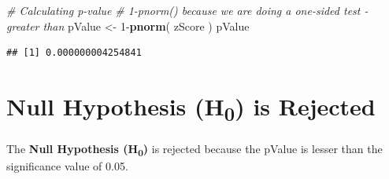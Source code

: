 \documentclass[]{article}
\newenvironment{Shaded}{\begin{snugshade}}{\end{snugshade}}
\newcommand{\KeywordTok}[1]{\textcolor[rgb]{0.13,0.29,0.53}{\textbf{{#1}}}}
\newcommand{\DecValTok}[1]{\textcolor[rgb]{0.00,0.00,0.81}{{#1}}}
\newcommand{\StringTok}[1]{\textcolor[rgb]{0.31,0.60,0.02}{{#1}}}
\newcommand{\CommentTok}[1]{\textcolor[rgb]{0.56,0.35,0.01}{\textit{{#1}}}}
\newcommand{\NormalTok}[1]{{#1}}
\begin{document}
\begin{Shaded}
\begin{Highlighting}[]
\CommentTok{# Calculating p-value}
\CommentTok{# 1-pnorm() because we are doing a one-sided test - greater than}
\NormalTok{pValue <-}\StringTok{ }\DecValTok{1}\NormalTok{-}\KeywordTok{pnorm}\NormalTok{( zScore ) }
\NormalTok{pValue}
\end{Highlighting}
\end{Shaded}

\begin{verbatim}
## [1] 0.000000004254841
\end{verbatim}

\section{Null Hypothesis (H\textsubscript{0}) is
Rejected}\label{null-hypothesis-h0-is-rejected}

The \textbf{Null Hypothesis (H\textsubscript{0})} is rejected because
the pValue is lesser than the significance value of 0.05.
\end{document}
